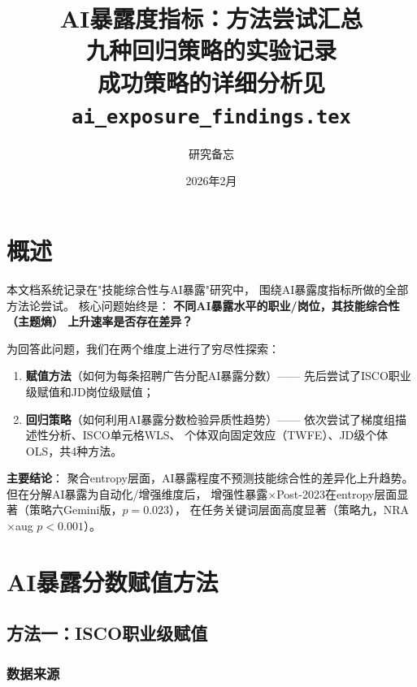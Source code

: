 \documentclass[12pt,a4paper]{ctexart}
\title{\textbf{AI暴露度指标：方法尝试汇总}\\[0.5em]
\large 九种回归策略的实验记录\\[0.3em]
\normalsize 成功策略的详细分析见 \texttt{ai\_exposure\_findings.tex}}
\author{研究备忘}
\date{2026年2月}
\begin{document}
\maketitle
\tableofcontents
\newpage


\section{概述}

本文档系统记录在"技能综合性与AI暴露"研究中，
围绕AI暴露度指标所做的全部方法论尝试。
核心问题始终是：
\textbf{不同AI暴露水平的职业/岗位，其技能综合性（主题熵）
上升速率是否存在差异？}

为回答此问题，我们在两个维度上进行了穷尽性探索：

\begin{enumerate}
\item \textbf{赋值方法}（如何为每条招聘广告分配AI暴露分数）——
      先后尝试了ISCO职业级赋值和JD岗位级赋值；
\item \textbf{回归策略}（如何利用AI暴露分数检验异质性趋势）——
      依次尝试了梯度组描述性分析、ISCO单元格WLS、
      个体双向固定效应（TWFE）、JD级个体OLS，共4种方法。
\end{enumerate}

\textbf{主要结论}：
聚合entropy层面，AI暴露程度不预测技能综合性的差异化上升趋势。
但在分解AI暴露为自动化/增强维度后，
增强性暴露$\times$Post-2023在entropy层面显著（策略六Gemini版，$p=0.023$），
在任务关键词层面高度显著（策略九，NRA$\times$aug $p<0.001$）。


\section{AI暴露分数赋值方法}
\label{sec:scoring}

\subsection{方法一：ISCO职业级赋值}
\label{subsec:isco_scoring}

\subsubsection{数据来源}
\end{document}
